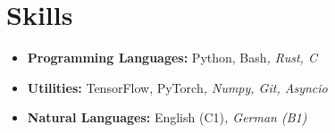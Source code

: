 \section*{Skills}
\begin{itemize}[itemsep=0mm]

    \item \textbf{Programming Languages:} Python, Bash\textit{, Rust, C}
    \item \textbf{Utilities:} TensorFlow, PyTorch\textit{, Numpy, Git, Asyncio}
    \item \textbf{Natural Languages:} English (C1)\textit{, German (B1)}

\end{itemize}
